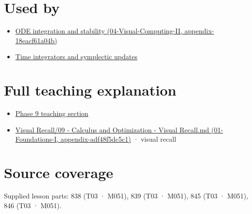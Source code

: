 \section{Used by}\label{appendix-e8ab9836882e-used-by}

\begin{itemize}
\tightlist
\item
  \href{../04-Visual-Computing-II/main.pdf\#nameddest=appendix-18eacf61a04b}{ODE integration and stability (04-Visual-Computing-II, appendix-18eacf61a04b)}
\item
  \hyperref[appendix-8f96f9c4d5bc]{Time integrators and symplectic updates}
\end{itemize}

\section{Full teaching explanation}\label{appendix-e8ab9836882e-full-teaching-explanation}

\begin{itemize}
\tightlist
\item
  \href{Continuous\%20Notes/Computing\%20Foundations\%20-\%20From\%20Bits\%20to\%20C++\%20and\%20Systems\%20APIs\#ODEs\%20and\%20numerical\%20simulation}{Phase 9 teaching section}
\item
  \href{../01-Foundations-I/main.pdf\#nameddest=appendix-adf48f5dc5c1}{Visual Recall/09 - Calculus and Optimization - Visual Recall.md (01-Foundations-I, appendix-adf48f5dc5c1)} · visual recall
\end{itemize}

\section{Source coverage}\label{appendix-e8ab9836882e-source-coverage}

Supplied lesson parts: 838 (T03 · M051), 839 (T03 · M051), 845 (T03 · M051), 846 (T03 · M051).
